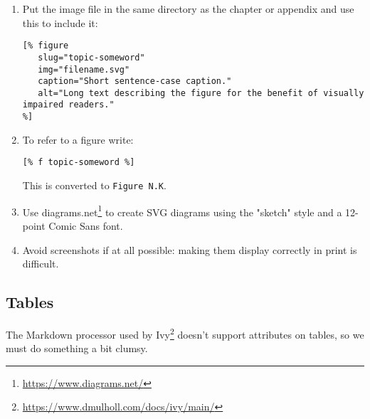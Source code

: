 \documentclass{scrbook}
\newcommand{\hreffoot}[2]{{#1}\footnote{\href{#2}{#2}}}
\begin{document}
\begin{enumerate}

\item 

Put the image file in the same directory as the chapter or appendix
    and use this to include it:

\begin{lstlisting}[frame=single,frameround=tttt]
[% figure
   slug="topic-someword"
   img="filename.svg"
   caption="Short sentence-case caption."
   alt="Long text describing the figure for the benefit of visually impaired readers."
%]
\end{lstlisting}



\item 

To refer to a figure write:

\begin{lstlisting}[frame=single,frameround=tttt]
[% f topic-someword %]
\end{lstlisting}


This is converted to \texttt{Figure N.K}.



\item 

Use \hreffoot{diagrams.net}{https://www.diagrams.net/} to create SVG diagrams
    using the "sketch" style and a 12-point Comic Sans font.



\item 

Avoid screenshots if at all possible:
    making them display correctly in print is difficult.



\end{enumerate}

\subsection*{Tables}


The Markdown processor used by \hreffoot{Ivy}{https://www.dmulholl.com/docs/ivy/main/} doesn't support attributes on tables,
so we must do something a bit clumsy.
\end{document}
